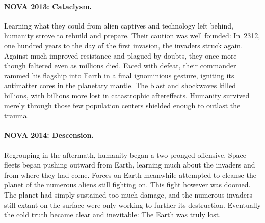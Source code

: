 \noindent\begin{minipage}[c]{(0.6\linewidth)-1em}%
\paragraph{NOVA 2013: Cataclysm.}  Learning what they could from alien
captives and technology left behind, humanity strove to rebuild and
prepare.  Their caution was well founded: In~2312, one hundred years
to the day of the first invasion, the invaders struck again.  Against
much improved resistance and plagued by doubts, they once more though
faltered even as millions died.  Faced with defeat, their commander
rammed his flagship into Earth in a final ignominious gesture,
igniting its antimatter cores in the planetary mantle.  The blast and
shockwaves killed billions, with billions more lost in catastrophic
aftereffects.  Humanity survived merely through those few population
centers shielded enough to outlast the trauma.

\bigskip
\paragraph{NOVA 2014: Descension.} Regrouping in the aftermath,
humanity began a two-pronged offensive.  Space fleets began pushing
outward from Earth, learning much about the invaders and from where
they had come.  Forces on Earth meanwhile attempted to cleanse the
planet of the numerous aliens still fighting on.  This fight however
was doomed.  The planet had simply sustained too much damage, and the
numerous invaders still extant on the surface were only working to
further its destruction.  Eventually the cold truth became clear and
inevitable: The Earth was truly lost.
\end{minipage}\hfill%
